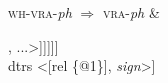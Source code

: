 \documentclass[preview]{standalone}
\begin{document}
\textsc{wh}-\textsc{vra}-\textit{ph} $\Rightarrow$ \textsc{vra}-\textit{ph} \& \\
\begin{avm}
[ss [cat [head [select [cont & [anchors & <..., [\textsc{ind} @1], ...>]]]]]\\
 dtrs <[rel \{@1\}], \textnormal{\textit{sign}}>] 
\end{avm}
\end{document}
